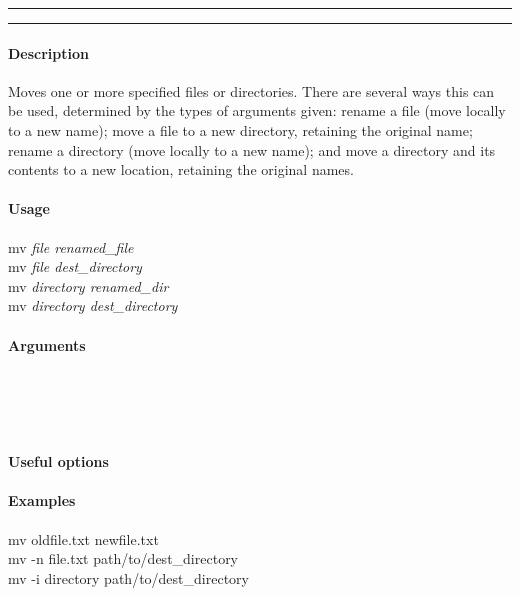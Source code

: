 \hrule
\vspace{1mm}
\hrule
\vspace{4mm}

\paragraph{Description}
\indentpar \raggedright \textrm{Moves one or more specified files or directories. There are several ways this can be used, determined by the types of arguments given: rename a file (move locally to a new name); move a file to a new directory, retaining the original name; rename a directory (move locally to a new name); and move a directory and its contents to a new location, retaining the original names.}\\

\paragraph{Usage}
\indentpar mv \textit{file renamed\_file}\\
\indentpar mv \textit{file dest\_directory}\\
\indentpar mv \textit{directory renamed\_dir}\\
\indentpar mv \textit{directory dest\_directory}

\paragraph{Arguments}
\indentpar {}\\
\indentpar {}\\
\indentpar {}
\indentpar {}\\
\indentpar {}


\paragraph{Useful options}
\indentpar {}
\indentpar {}

\paragraph{Examples}
\indentpar mv oldfile.txt newfile.txt\\
\indentpar mv -n file.txt path/to/dest\_directory\\
\indentpar mv -i directory path/to/dest\_directory

\vspace{20mm}